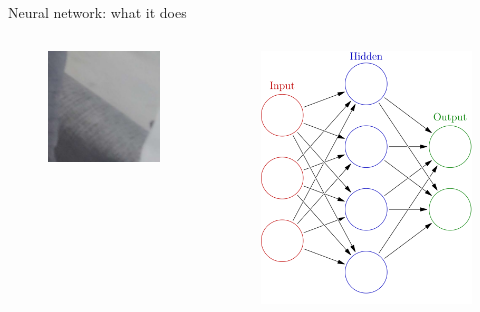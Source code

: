 \documentclass{beamer}
\begin{document}
\begin{frame}{Neural network: what it does}
\begin{columns}
\begin{column}{0.05\textwidth}
\begin{figure}
                \includegraphics[width=\linewidth]{distorted/distorted-3-3}
            \end{figure}\pause
        \end{column}
        \begin{column}{0.3\textwidth}
            \begin{figure}
                \centering
                \includegraphics[width=\linewidth]{neural.png}

\end{figure}
\end{column}
\end{columns}
\end{frame}
\end{document}
